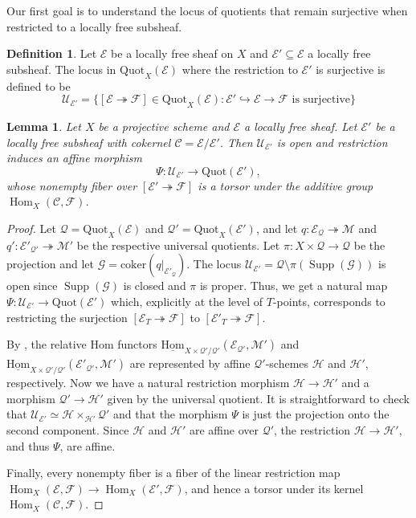 \documentclass[leqno,11pt,a4paper]{amsart}
\newtheorem{lemma}[lemma]{Lemma}
\theoremstyle{definition}
\newtheorem{definition}[definition]{Definition}
\numberwithin{equation}{section}
\newcommand{\Quot}{\mathrm{Quot}}
\newcommand{\EE}{\mathscr{E}}
\newcommand{\CC}{\mathscr{C}}
\newcommand{\FF}{\mathscr{F}}
\newcommand{\MM}{\mathscr{M}}
\newcommand{\GG}{\mathscr{G}}
\newcommand{\HH}{\mathcal{H}}
\newcommand{\QQ}{\mathcal{Q}}
\newcommand{\UU}{\mathcal{U}}
\DeclareMathOperator{\Hom}{Hom}
\DeclareMathOperator{\Supp}{Supp}
\begin{document}
Our first goal is to understand the locus of quotients that remain surjective when restricted to a locally free subsheaf.


\begin{definition} 
Let $\EE$ be a locally free sheaf on $X$ and $\EE' \subseteq \EE$ a locally free subsheaf. 
The locus in $ \Quot_X(\EE)$ where the restriction to $\EE'$ is surjective is defined to be
$$
\UU_{\EE'} = \{[\EE \twoheadrightarrow \FF] \in \Quot_X(\EE): \EE' \hookrightarrow \EE \to \FF \text{ is surjective}\}
$$ 
\end{definition}


\begin{lemma} \label{restriction_open}
Let $X$ be a projective scheme and $\EE$ a locally free sheaf. Let $\EE'$ be a locally free subsheaf with cokernel $\mathscr{C} = \EE/\EE'$. 
Then  $\UU_{\EE'}$ is open and restriction induces an affine morphism
$$
\Psi:\UU_{\EE'} \longrightarrow \Quot(\EE'),
$$
whose nonempty fiber over $[\EE' \twoheadrightarrow \FF]$ is a torsor under the additive group $\Hom_X(\mathscr{C},\FF)$.
\end{lemma}
\begin{proof}
Let $\QQ=\Quot_X(\EE)$ and $\QQ' = \Quot_X(\EE')$, and let $q: \EE_\QQ \twoheadrightarrow \MM$ and $q': \EE'_{\QQ'} \twoheadrightarrow \MM'$ be the respective universal quotients. 
Let $\pi: X \times \QQ \to \QQ$ be the projection and let $\GG = \mathrm{coker}(q|_{\EE'_\QQ})$. 
The locus $\UU_{\EE'} = \QQ \setminus \pi(\Supp(\GG))$ is open since $\Supp(\GG)$ is closed and $\pi$ is proper. 
Thus, we get a natural map $\Psi:\UU_{\EE'} \to \Quot(\EE')$ which, explicitly at the level of $T$-points, corresponds to restricting the surjection $[\EE_T \twoheadrightarrow\FF]$ to $[\EE'_T \twoheadrightarrow \FF]$.

By \cite[\href{https://stacks.math.columbia.edu/tag/08K6}{Tag 08K6}]{stacks_project}, the relative Hom functors $\underline{\mathrm{Hom}}_{X\times \QQ'/\QQ'}(\EE_{\QQ'},\MM')$ and $\underline{\mathrm{Hom}}_{X\times \QQ'/\QQ'}(\EE'_{\QQ'}, \MM')$ are represented by affine $\QQ'$-schemes $\HH$ and $\HH'$, respectively. 
Now we have a natural restriction morphism $\HH \to \HH'$ and a morphism $\QQ' \to \HH'$ given by the universal quotient. 
It is straightforward to check that $\UU_{\EE'} \simeq \HH \times_{\HH'} \QQ'$ and that the morphism $\Psi$ is just the projection onto the second component. 
Since $\HH$ and $\HH'$ are affine over $\QQ'$, the restriction $\HH\to\HH'$, and thus $\Psi$, are affine.

Finally, every nonempty fiber is a fiber of the linear restriction map $\Hom_X(\EE, \FF) \to \Hom_X(\EE',\FF)$, and hence a torsor under its kernel $\Hom_X(\CC,\FF)$.
\end{proof}
\end{document}
